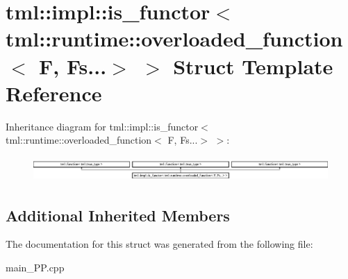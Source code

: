 \hypertarget{structtml_1_1impl_1_1is__functor_3_01tml_1_1runtime_1_1overloaded__function_3_01F_00_01Fs_8_8_8_4_01_4}{\section{tml\+:\+:impl\+:\+:is\+\_\+functor$<$ tml\+:\+:runtime\+:\+:overloaded\+\_\+function$<$ F, Fs...$>$ $>$ Struct Template Reference}
\label{structtml_1_1impl_1_1is__functor_3_01tml_1_1runtime_1_1overloaded__function_3_01F_00_01Fs_8_8_8_4_01_4}
}
Inheritance diagram for tml\+:\+:impl\+:\+:is\+\_\+functor$<$ tml\+:\+:runtime\+:\+:overloaded\+\_\+function$<$ F, Fs...$>$ $>$\+:\begin{figure}[H]
\begin{center}
\leavevmode
\includegraphics[height=0.945148cm]{structtml_1_1impl_1_1is__functor_3_01tml_1_1runtime_1_1overloaded__function_3_01F_00_01Fs_8_8_8_4_01_4}
\end{center}
\end{figure}
\subsection*{Additional Inherited Members}


The documentation for this struct was generated from the following file\+:\begin{DoxyCompactItemize}
\item 
main\+\_\+\+P\+P.\+cpp\end{DoxyCompactItemize}
